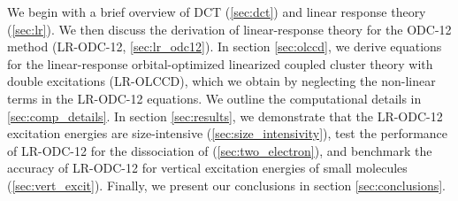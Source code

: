 We begin with a brief overview of DCT (\cref{sec:dct}) and linear response
theory (\cref{sec:lr}). We then discuss the derivation of linear-response
theory for the ODC-12 method (LR-ODC-12, \cref{sec:lr_odc12}).
In section \cref{sec:olccd}, 
we derive equations for the linear-response orbital-optimized linearized
coupled cluster theory with double excitations (LR-OLCCD), which we obtain by
neglecting the non-linear terms in the LR-ODC-12 equations. 
We outline the
computational details in \cref{sec:comp_details}.
In section \cref{sec:results}, we demonstrate that the LR-ODC-12 excitation
energies are size-intensive (\cref{sec:size_intensivity}), test the performance
of LR-ODC-12 for the dissociation of  (\cref{sec:two_electron}), and
benchmark the accuracy of LR-ODC-12 for vertical
excitation energies of small molecules (\cref{sec:vert_excit}).
Finally, we present our conclusions in section \cref{sec:conclusions}. 
